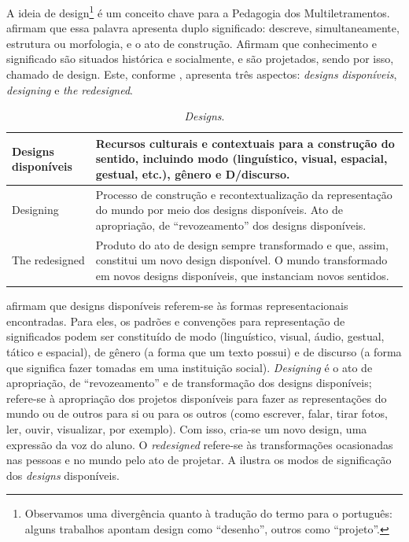 \documentclass{textolivre}
\begin{document}
A ideia de design\footnote{
Observamos uma divergência quanto à tradução do termo para o português: alguns
trabalhos apontam design como “desenho”, outros como “projeto”.
} é um conceito chave para a Pedagogia dos Multiletramentos.
\textcite{cope2009} afirmam que essa palavra apresenta duplo significado:
descreve, simultaneamente, estrutura ou morfologia, e o ato de construção.
Afirmam que conhecimento e significado são situados histórica e socialmente, e
são projetados, sendo por isso, chamado de design. Este, conforme ,
apresenta três aspectos: \emph{designs disponíveis}, \emph{designing} e \emph{the redesigned}.

\begin{table}[htpb]
\caption{\emph{Designs}.}
\label{tbl02}
\begin{tabular}{lp{10cm}}
\toprule
Designs disponíveis & Recursos culturais e contextuais para a construção do sentido, incluindo modo (linguístico, visual, espacial, gestual, etc.), gênero e D/discurso. \\
\midrule
Designing & Processo de construção e recontextualização da representação do mundo por meio dos designs disponíveis. Ato de apropriação, de “revozeamento” dos designs disponíveis. \\
\midrule
The redesigned & Produto do ato de design sempre transformado e que, assim, constitui um novo design disponível. O mundo transformado em novos designs disponíveis, que instanciam novos sentidos. \\
\bottomrule
\end{tabular}
\end{table}


\textcite{cope2009} afirmam que designs disponíveis referem-se às formas
representacionais encontradas. Para eles, os padrões e convenções para
representação de significados podem ser constituído de modo (linguístico,
visual, áudio, gestual, tático e espacial), de gênero (a forma que um texto
possui) e de discurso (a forma que significa fazer tomadas em uma instituição
social). \emph{Designing} é o ato de apropriação, de “revozeamento” e de transformação
dos designs disponíveis; refere-se à apropriação dos projetos disponíveis para
fazer as representações do mundo ou de outros para si ou para os outros (como
escrever, falar, tirar fotos, ler, ouvir, visualizar, por exemplo). Com isso,
cria-se um novo design, uma expressão da voz do aluno. O \emph{redesigned} refere-se
às transformações ocasionadas nas pessoas e no mundo pelo ato de projetar. A
 ilustra os modos de significação dos \emph{designs} disponíveis.
\end{document}
